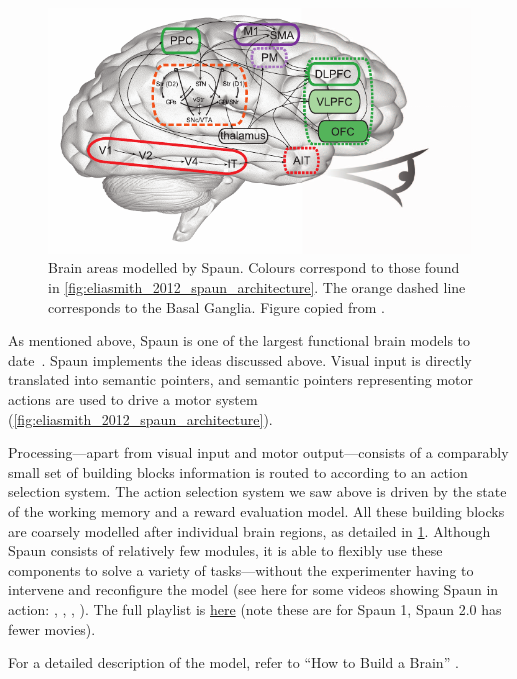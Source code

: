 \documentclass[10pt,letterpaper,oneside]{article}
\begin{document}
\begin{figure}
	\includegraphics[width=\textwidth]{media/eliasmith_2012_spaun_anatomy.pdf}
	\caption{Brain areas modelled by Spaun. Colours correspond to those found in \cref{fig:eliasmith_2012_spaun_architecture}. The orange dashed line corresponds to the Basal Ganglia. Figure copied from \cite{eliasmith2012largescale}.}
	\label{fig:eliasmith_2012_spaun_anatomy}
\end{figure}

As mentioned above, Spaun is one of the largest functional brain models to date~\cite{eliasmith2012largescale}. Spaun implements the ideas discussed above. Visual input is directly translated into semantic pointers, and semantic pointers representing motor actions are used to drive a motor system (\cref{fig:eliasmith_2012_spaun_architecture}).

Processing---apart from visual input and motor output---consists of a comparably small set of building blocks information is routed to according to an action selection system. The action selection system we saw above is driven by the state of the working memory and a reward evaluation model. All these building blocks are coarsely modelled after individual brain regions, as detailed in \cref{fig:eliasmith_2012_spaun_anatomy}. Although Spaun consists of relatively few modules, it is able to flexibly use these components to solve a variety of tasks---without the experimenter having to intervene and reconfigure the model (see here for some videos showing Spaun in action: , , , ). The full playlist is \href{https://www.youtube.com/playlist?list=PLYLu6sY3jnoV2DNi84T5OKqJ0oYTxFrQv}{here} (note these are for Spaun 1, Spaun 2.0 has fewer movies).

For a detailed description of the model, refer to \enquote{How to Build a Brain} \cite{eliasmith2013how}.

\printbibliography
\end{document}
